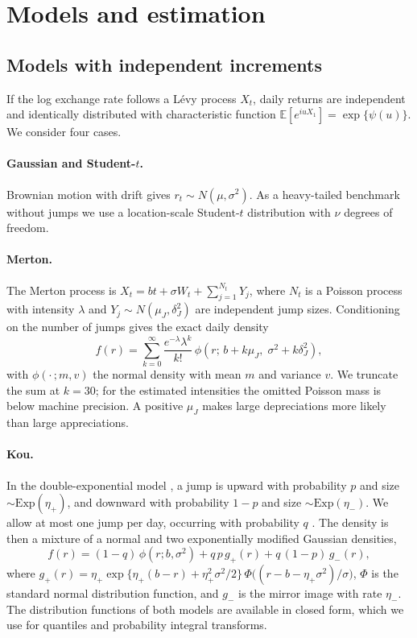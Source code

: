 \documentclass[11pt]{article}
\newcommand{\E}{\mathbb{E}}
\begin{document}
\section{Models and estimation}\label{sec:models}

\subsection{Models with independent increments}

If the log exchange rate follows a Lévy process $X_t$, daily returns are independent and identically distributed with characteristic function $\E[e^{iuX_1}] = \exp\{\psi(u)\}$. We consider four cases.

\paragraph{Gaussian and Student-$t$.} Brownian motion with drift gives $r_t \sim N(\mu,\sigma^2)$. As a heavy-tailed benchmark without jumps we use a location-scale Student-$t$ distribution with $\nu$ degrees of freedom.

\paragraph{Merton.} The Merton process is $X_t = bt + \sigma W_t + \sum_{j=1}^{N_t} Y_j$, where $N_t$ is a Poisson process with intensity $\lambda$ and $Y_j \sim N(\mu_J,\delta_J^2)$ are independent jump sizes. Conditioning on the number of jumps gives the exact daily density
\begin{equation}\label{eq:merton}
f(r) = \sum_{k=0}^{\infty} \frac{e^{-\lambda}\lambda^k}{k!}\,\phi\!\left(r;\, b + k\mu_J,\; \sigma^2 + k\delta_J^2\right),
\end{equation}
with $\phi(\cdot\,; m, v)$ the normal density with mean $m$ and variance $v$. We truncate the sum at $k=30$; for the estimated intensities the omitted Poisson mass is below machine precision. A positive $\mu_J$ makes large depreciations more likely than large appreciations.

\paragraph{Kou.} In the double-exponential model \citep{kou2002}, a jump is upward with probability $p$ and size $\sim \mathrm{Exp}(\eta_+)$, and downward with probability $1-p$ and size $\sim \mathrm{Exp}(\eta_-)$. We allow at most one jump per day, occurring with probability $q$ \citep{balltorous1983}. The density is then a mixture of a normal and two exponentially modified Gaussian densities,
\begin{equation}\label{eq:kou}
f(r) = (1-q)\,\phi(r; b,\sigma^2) + q\,p\,g_+(r) + q\,(1-p)\,g_-(r),
\end{equation}
where $g_+(r) = \eta_+ \exp\{\eta_+(b-r) + \eta_+^2\sigma^2/2\}\,\Phi\big((r-b-\eta_+\sigma^2)/\sigma\big)$, $\Phi$ is the standard normal distribution function, and $g_-$ is the mirror image with rate $\eta_-$. The distribution functions of both models are available in closed form, which we use for quantiles and probability integral transforms.
\end{document}
